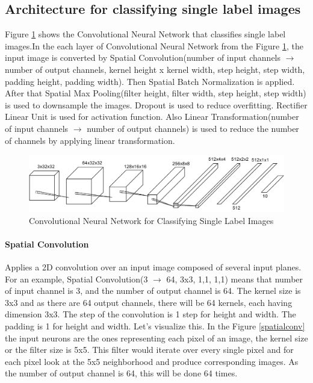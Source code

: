 \subsection{Architecture for classifying single label images}
Figure \ref{singlelabel} shows the Convolutional Neural Network that classifies single label images.In 
the each layer of Convolutional Neural Network from the Figure \ref{singlelabel}, the input image is converted by Spatial Convolution(number of input channels \(\rightarrow\) number of output channels, kernel height x kernel width, step height, step width, padding height, padding width). Then Spatial Batch Normalization is applied. After that Spatial Max Pooling(filter height, filter width, step height, step width) is used to downsample the images. Dropout is used to reduce overfitting. Rectifier Linear Unit is used for activation function. Also Linear Transformation(number of input channels \(\rightarrow\) number of output channels) is used to reduce the number of channels by applying linear transformation.

\begin{figure}[!htb]
  \centering
  \includegraphics[width=.5\textwidth]{images/singlelabel.png}
  \caption{Convolutional Neural Network for Classifying Single Label Images}
   \vspace{-.5cm} \label{singlelabel}
\end{figure} 


 \paragraph{Spatial Convolution}
  
  Applies a 2D convolution over an input image composed of several input planes. For an example, Spatial Convolution(3 \(\rightarrow\) 64, 3x3, 1,1, 1,1) means that number of input channel is 3, and the number of output channel is 64. The kernel size is 3x3 and as there are 64 output channels, there will be 64 kernels, each having dimension 3x3. The step of the convolution is 1 step for height and width. The padding is 1 for height and width. Let's visualize this. In the Figure \ref{spatialconv} the input neurons are the ones representing each pixel of an image, the kernel size or the filter size is 5x5. This filter would iterate over every single pixel and for each pixel look at the 5x5 neighborhood and produce corresponding images. As the number of output channel is 64, this will be done 64 times.
  
